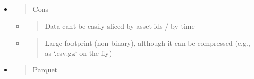 \documentclass[11pt, reqno]{amsart}
\begin{document}
\begin{itemize}
\item
  \begin{quote}
  Cons
  \end{quote}

  \begin{itemize}
  \item
    \begin{quote}
    Data can\textquotesingle t be easily sliced by asset ids / by time
    \end{quote}
  \item
    \begin{quote}
    Large footprint (non binary), although it can be compressed (e.g.,
    as `.csv.gz` on the fly)
    \end{quote}
  \end{itemize}
\end{itemize}

\begin{itemize}
\item
  \begin{quote}
  Parquet
  \end{quote}
\end{itemize}
\end{document}
